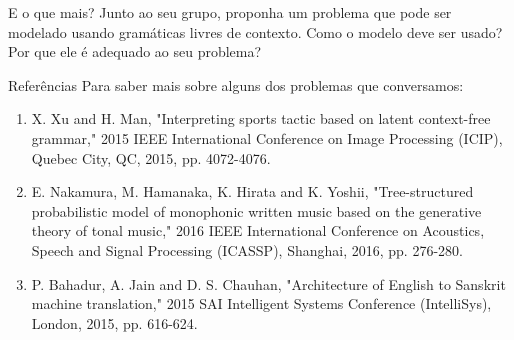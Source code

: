 \documentclass{beamer}
\begin{document}
\begin{frame}{E o que mais?}
\large
Junto ao seu grupo, proponha um problema que pode ser modelado usando gramáticas
livres de contexto. Como o modelo deve ser usado? Por que ele é adequado ao seu
problema?
\end{frame}

\begin{frame}{Referências}
\large
  Para saber mais sobre alguns dos problemas que conversamos:
  \begin{enumerate}
\item X. Xu and H. Man, "Interpreting sports tactic based on latent context-free
  grammar," 2015 IEEE International Conference on Image Processing (ICIP),
      Quebec City, QC, 2015, pp. 4072-4076.
\item E. Nakamura, M. Hamanaka, K. Hirata and K. Yoshii, "Tree-structured
  probabilistic model of monophonic written music based on the generative theory
      of tonal music," 2016 IEEE International Conference on Acoustics, Speech
      and Signal Processing (ICASSP), Shanghai, 2016, pp. 276-280.
 \item P. Bahadur, A. Jain and D. S. Chauhan, "Architecture of English to
   Sanskrit machine translation," 2015 SAI Intelligent Systems Conference
      (IntelliSys), London, 2015, pp. 616-624.
  \end{enumerate}
\end{frame}
\end{document}
